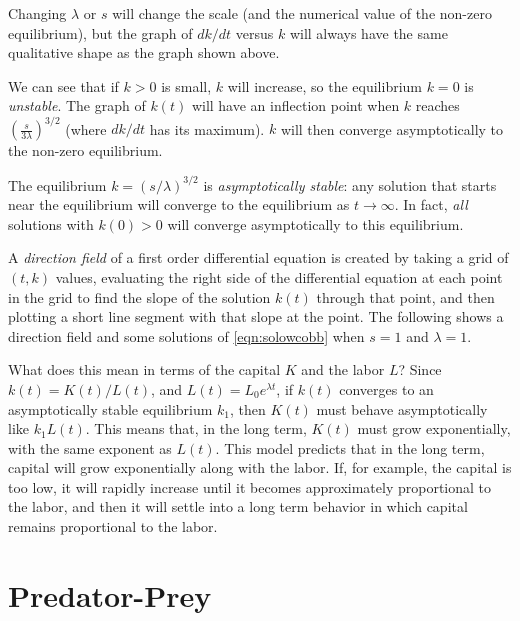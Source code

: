 \documentclass[reqno]{immbook}
\begin{document}
\noindent
Changing $\lambda$ or $s$ will change the scale
(and the numerical value of the non-zero equilibrium),
but the graph of $dk/dt$ versus $k$ will always have the
same qualitative shape as the graph shown above.

We can see that if $k>0$ is small, $k$
will increase, so the equilibrium $k=0$ is \emph{unstable}.
The graph of $k(t)$ will have an inflection point when $k$ reaches
$\left(\frac{s}{3\lambda}\right)^{3/2}$ (where $dk/dt$ has its maximum).
$k$ will then converge asymptotically to the non-zero equilibrium.

The equilibrium $k=(s/\lambda)^{3/2}$ is \emph{asymptotically stable}:
any solution that starts near the equilibrium will converge to the equilibrium
as $t\rightarrow \infty$.
In fact, \emph{all} solutions with $k(0)>0$ will converge asymptotically to this
equilibrium.

A \emph{direction field} of a first order differential equation is created by
taking a grid of $(t,k)$ values, evaluating the right side of the differential
equation at each point in the grid to find the slope of the solution $k(t)$
through that point, and then plotting a short line segment with that slope
at the point.
The following shows a direction field and some solutions
of \eqref{eqn:solowcobb} when $s=1$ and $\lambda=1$.

\centerline{}

\vspace{0.25in}

What does this mean in terms of the capital $K$ and the labor $L$?
Since $k(t) = K(t)/L(t)$, and $L(t) = L_0e^{\lambda t}$, if $k(t)$ converges to an
asymptotically stable equilibrium $k_1$, then $K(t)$ must behave asymptotically like
$k_1  L(t)$.  This means that, in the long term, $K(t)$ must 
grow exponentially, with the
same exponent as $L(t)$.
This model predicts that in the long term, capital will grow
exponentially along with the labor.
If, for example, the capital is too low, it will rapidly increase until it becomes
approximately proportional to the labor, and then it will settle into a long term behavior in
which capital remains proportional to the labor.

%
\section{Predator-Prey}
%
\end{document}
